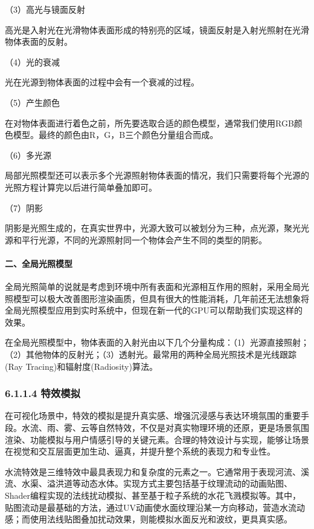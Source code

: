 （3）高光与镜面反射

高光是入射光在光滑物体表面形成的特别亮的区域，镜面反射是入射光照射在光滑物体表面的反射。

（4）光的衰减

光在光源到物体表面的过程中会有一个衰减的过程。

（5）产生颜色

在对物体表面进行着色之前，所先要选取合适的颜色模型，通常我们使用RGB颜色模型。最终的颜色由R，G，B三个颜色分量组合而成。

（6）多光源

局部光照模型还可以表示多个光源照射物体表面的情况，我们只需要将每个光源的光照方程计算完以后进行简单叠加即可。

（7）阴影

阴影是光照生成的，在真实世界中，光源大致可以被划分为三种，点光源，聚光光源和平行光源，不同的光源照射同一个物体会产生不同的类型的阴影。

\paragraph{二、全局光照模型}\label{ux4e8cux5168ux5c40ux5149ux7167ux6a21ux578b}

全局光照简单的说就是考虑到环境中所有表面和光源相互作用的照射，采用全局光照模型可以极大改善图形渲染画质，但具有很大的性能消耗，几年前还无法想象将全局光照模型应用到实时系统中，但现在新一代的GPU可以帮助我们实现这样的效果。

在全局光照模型中，物体表面的入射光由以下几个分量构成：（1）光源直接照射；（2）其他物体的反射光；（3）透射光。最常用的两种全局光照技术是光线跟踪(Ray
Tracing)和辐射度(Radiosity)算法。

\subsubsection{6.1.1.4 特效模拟}\label{ux7279ux6548ux6a21ux62df}

在可视化场景中，特效的模拟是提升真实感、增强沉浸感与表达环境氛围的重要手段。水流、雨、雾、云等自然特效，不仅是对真实物理环境的还原，更是场景氛围渲染、功能模拟与用户情感引导的关键元素。合理的特效设计与实现，能够让场景在视觉和交互层面更加生动、逼真，并提升整个系统的表现力和专业性。

水流特效是三维特效中最具表现力和复杂度的元素之一。它通常用于表现河流、溪流、水渠、溢洪道等动态水体。实现方式主要包括基于纹理流动的动画贴图、Shader编程实现的法线扰动模拟、甚至基于粒子系统的水花飞溅模拟等。其中，贴图流动是最基础的方法，通过UV动画使水面纹理沿某一方向移动，营造水流动感；而使用法线贴图叠加扰动效果，则能模拟水面反光和波纹，更具真实感。


